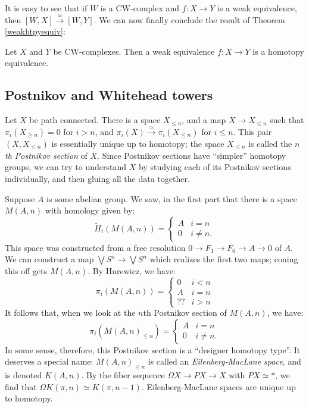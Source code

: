 It is easy to see that if $W$ is a CW-complex and $f:X\to Y$ is a weak
equivalence, then $[W,X]\xrightarrow{\simeq}[W,Y]$. We can now finally conclude
the result of Theorem \ref{weakhtpyequiv}:
\begin{corollary}
    Let $X$ and $Y$ be CW-complexes. Then a weak equivalence $f:X\to Y$ is a
    homotopy equivalence.
\end{corollary}
\subsection{Postnikov and Whitehead towers}
Let $X$ be path connected. There is a space $X_{\leq n}$, and a map $X\to
X_{\leq n}$ such that $\pi_i(X_{\geq n}) = 0$ for $i>n$, and
$\pi_i(X)\xrightarrow{\simeq}\pi_i(X_{\leq n})$ for $i\leq n$. This pair
$(X,X_{\leq n})$ is essentially unique up to homotopy; the space $X_{\leq n}$
is called the \emph{$n$th Postnikov section} of $X$. Since Postnikov sections
have ``simpler'' homotopy groups, we can try to understand $X$ by studying each
of its Postnikov sections individually, and then gluing all the data together.

Suppose $A$ is some abelian group. We saw, in the first part that there is a space $M(A,n)$ with homology given by:
\begin{equation*}
    \widetilde{H}_i(M(A,n)) = \begin{cases}
	A & i = n\\
	0 & i\neq n.
    \end{cases}
\end{equation*}
This space was constructed from a free resolution $0\to F_1\to F_0\to A\to 0$
of $A$. We can construct a map $\bigvee S^n\to \bigvee S^n$ which realizes the
first two maps; coning this off gets $M(A,n)$. By Hurewicz, we have:
\begin{equation*}
    \pi_i(M(A,n)) = \begin{cases}
	0 & i<n\\
	A & i = n\\
	?? & i>n
    \end{cases}
\end{equation*}
It follows that, when we look at the $n$th Postnikov section of $M(A,n)$, we
have:
\begin{equation*}
    \pi_i(M(A,n)_{\leq n}) = \begin{cases}
	A & i = n\\
	0 & i\neq n.
    \end{cases}
\end{equation*}
In some sense, therefore, this Postnikov section is a ``designer homotopy
type''. It deserves a special name: $M(A,n)_{\leq n}$ is called an
\emph{Eilenberg-MacLane space}, and is denoted $K(A,n)$. By the fiber sequence
$\Omega X\to PX\to X$ with $PX\simeq \ast$, we find that $\Omega K(\pi,n)\simeq
K(\pi,n-1)$. Eilenberg-MacLane spaces are unique up to homotopy.

